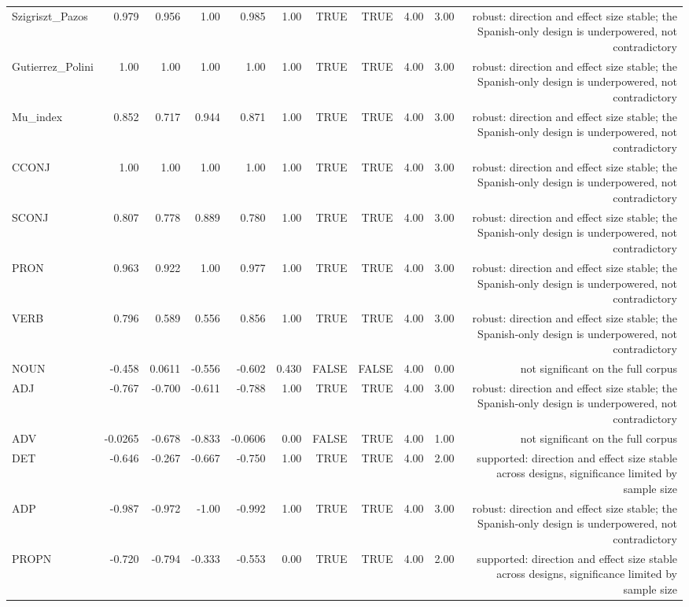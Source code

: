 \begin{table}[htbp]
\begin{tabular}{lrrrrrrrrrr}
Szigriszt\_Pazos & 0.979 & 0.956 & 1.00 & 0.985 & 1.00 & TRUE & TRUE & 4.00 & 3.00 & robust: direction and effect size stable; the Spanish-only design is underpowered, not contradictory \\
Gutierrez\_Polini & 1.00 & 1.00 & 1.00 & 1.00 & 1.00 & TRUE & TRUE & 4.00 & 3.00 & robust: direction and effect size stable; the Spanish-only design is underpowered, not contradictory \\
Mu\_index & 0.852 & 0.717 & 0.944 & 0.871 & 1.00 & TRUE & TRUE & 4.00 & 3.00 & robust: direction and effect size stable; the Spanish-only design is underpowered, not contradictory \\
CCONJ & 1.00 & 1.00 & 1.00 & 1.00 & 1.00 & TRUE & TRUE & 4.00 & 3.00 & robust: direction and effect size stable; the Spanish-only design is underpowered, not contradictory \\
SCONJ & 0.807 & 0.778 & 0.889 & 0.780 & 1.00 & TRUE & TRUE & 4.00 & 3.00 & robust: direction and effect size stable; the Spanish-only design is underpowered, not contradictory \\
PRON & 0.963 & 0.922 & 1.00 & 0.977 & 1.00 & TRUE & TRUE & 4.00 & 3.00 & robust: direction and effect size stable; the Spanish-only design is underpowered, not contradictory \\
VERB & 0.796 & 0.589 & 0.556 & 0.856 & 1.00 & TRUE & TRUE & 4.00 & 3.00 & robust: direction and effect size stable; the Spanish-only design is underpowered, not contradictory \\
NOUN & -0.458 & 0.0611 & -0.556 & -0.602 & 0.430 & FALSE & FALSE & 4.00 & 0.00 & not significant on the full corpus \\
ADJ & -0.767 & -0.700 & -0.611 & -0.788 & 1.00 & TRUE & TRUE & 4.00 & 3.00 & robust: direction and effect size stable; the Spanish-only design is underpowered, not contradictory \\
ADV & -0.0265 & -0.678 & -0.833 & -0.0606 & 0.00 & FALSE & TRUE & 4.00 & 1.00 & not significant on the full corpus \\
DET & -0.646 & -0.267 & -0.667 & -0.750 & 1.00 & TRUE & TRUE & 4.00 & 2.00 & supported: direction and effect size stable across designs, significance limited by sample size \\
ADP & -0.987 & -0.972 & -1.00 & -0.992 & 1.00 & TRUE & TRUE & 4.00 & 3.00 & robust: direction and effect size stable; the Spanish-only design is underpowered, not contradictory \\
PROPN & -0.720 & -0.794 & -0.333 & -0.553 & 0.00 & TRUE & TRUE & 4.00 & 2.00 & supported: direction and effect size stable across designs, significance limited by sample size \\

\end{tabular}
\end{table}
